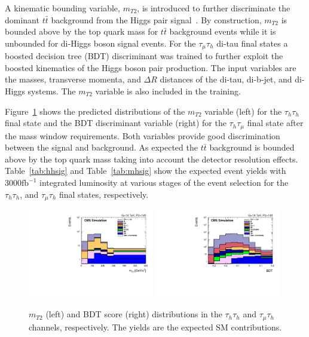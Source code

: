 A kinematic bounding variable, $m_{T2}$, is introduced to further
discriminate the dominant $t\bar{t}$ background from the Higgs pair signal~\cite{smt}. By construction, $m_{T2}$ is 
bounded above by the top quark mass for $t\bar{t}$ background events
while it is unbounded for di-Higgs boson signal events. For the
$\tau_{\mu}\tau_{h}$ di-tau final states a boosted decision tree (BDT) discriminant was trained to further exploit the boosted kinematics of the Higgs boson pair production. The input variables are the masses, transverse momenta, and $\Delta R$ distances of the di-tau, di-b-jet, and di-Higgs systems. The $m_{T2}$ variable is also included in the training.

Figure~\ref{fig:bdtout} shows the predicted distributions of the $m_{T2}$ variable (left) for the $\tau_{h}\tau_{h}$ final state and the BDT discriminant variable (right) for the $\tau_{h}\tau_{\mu}$ final state after the mass window requirements. Both variables provide good discrimination between the signal and background. As expected the $t\bar{t}$ background is bounded above by the top quark mass taking into account the detector resolution effects. Table~\ref{tab:hhsig} and Table~\ref{tab:mhsig} show the expected event yields with $3000 \mathrm{fb}^{-1}$ integrated luminosity at various stages of the event selection for the $\tau_{h}\tau_{h}$, and $\tau_{\mu}\tau_{h}$ final states, respectively. 

\begin{figure}[hbtp]
\begin{center}
\includegraphics[width=0.49\textwidth]{figures_chapter6/thth_mt2.pdf}   
\includegraphics[width=0.49\textwidth]{figures_chapter6/tmth_bdt.pdf}
\caption{$m_{T2}$ (left) and BDT score (right) distributions in  the $\tau_{h}\tau_{h}$ and  $\tau_{\mu}\tau_{h}$ channels, respectively. The yields are the expected SM 
contributions.}
\label{fig:bdtout}
\end{center}
\end{figure}

